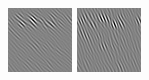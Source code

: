 \begin{figure}
\begin{center}
  \includegraphics[width=\columnwidth/9]{ch4/figures/imag_-1_6.jpg}
  \includegraphics[width=\columnwidth/9]{ch4/figures/imag_-1_7.jpg}\\

\end{center}
\end{figure}
